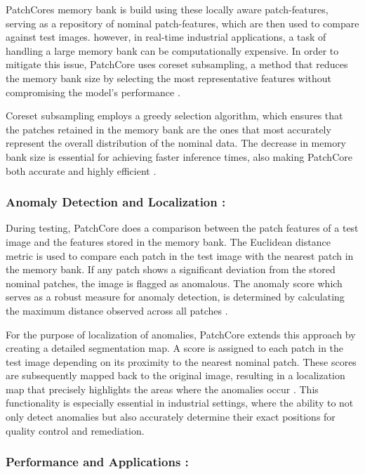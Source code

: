 PatchCores memory bank is build using these locally aware patch-features, serving as a repository of nominal patch-features, which are then used to compare against test images. however, in real-time industrial applications, a task of handling a large memory bank can be computationally expensive. In order to mitigate this issue, PatchCore uses coreset subsampling, a method that reduces the memory bank size by selecting the most representative features without compromising the model's performance \cite{roth2022totalrecallindustrialanomaly}.

Coreset subsampling employs a greedy selection algorithm, which ensures that the patches retained in the memory bank are the ones that most accurately represent the overall distribution of the nominal data. The decrease in memory bank size is essential for achieving faster inference times, also making PatchCore both accurate and highly efficient \cite{roth2022totalrecallindustrialanomaly}.

\subsubsection*{Anomaly Detection and Localization :}

During testing, PatchCore does a comparison between the patch features of a test image and the features stored in the memory bank. The Euclidean distance metric is used to compare each patch in the test image with the nearest patch in the memory bank. If any patch shows a significant deviation from the stored nominal patches, the image is flagged as anomalous. The anomaly score which serves as a robust measure for anomaly detection, is determined by calculating the maximum distance observed across all patches \cite{roth2022totalrecallindustrialanomaly}.

For the purpose of localization of anomalies, PatchCore extends this approach by creating a detailed segmentation map. A score is assigned to each patch in the test image depending on its proximity to the nearest nominal patch. These scores are subsequently mapped back to the original image, resulting in a localization map that precisely highlights the areas where the anomalies occur \cite{roth2022totalrecallindustrialanomaly}. This functionality is especially essential in industrial settings, where the ability to not only detect anomalies but also accurately determine their exact positions for quality control and remediation.

\subsubsection*{Performance and Applications :}

